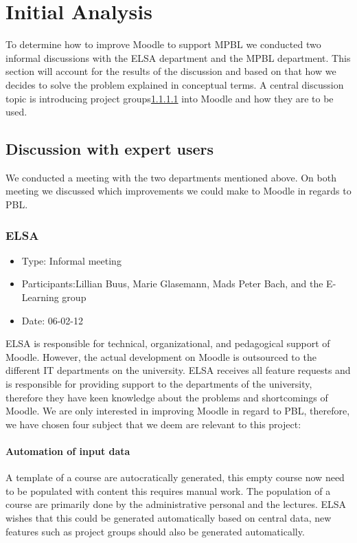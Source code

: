 \section{Initial Analysis}
\label{sec:initialAnalysis}
To determine how to improve Moodle to support MPBL we conducted two informal discussions with the ELSA department\cite{elsa} and the MPBL department\cite{mpbl}. This section will account for the results of the discussion and based on that how we decides to solve the problem explained in conceptual terms. A central discussion topic is introducing project groups\ref{}  into Moodle and how they are to be used.     

\subsection{Discussion with expert users}  
\label{sub:expertUsers} 
We conducted a meeting with the two departments mentioned above. On both meeting we discussed which improvements we could make to Moodle in regards to PBL.  

\subsubsection{ELSA}
\begin{itemize}
	\item Type: Informal meeting
	\item Participants:Lillian Buus, Marie Glasemann, Mads Peter Bach, and the E-Learning group  
	\item Date: 06-02-12
\end{itemize}
ELSA is responsible for technical, organizational, and pedagogical support of Moodle\cite{elsa}. 
However, the actual development on Moodle is outsourced to the different IT departments on the university. 
ELSA receives all feature requests and is responsible for providing support to the departments of the university, therefore they have keen knowledge about the problems and shortcomings of Moodle. 
We are only interested in improving Moodle in regard to PBL, therefore, we have chosen four subject that we deem are relevant to this project:

\paragraph{Automation of input data} A template of a course are autocratically generated, this empty course now need to be populated with content this requires manual work. 
The population of a course are primarily done by the administrative personal and the lectures. 
ELSA wishes that this could be generated automatically based on central data, new features such as project groups should also be generated automatically.     

